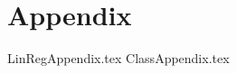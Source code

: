 \documentclass[
	letterpaper,
	a4paper,
	cleardoublepage=empty,
	headings=twolinechapter,
	numbers=autoenddot,
]{article}
\newcounter{appendix}
\begin{document}
	\pagebreak
	
	

	


	\pagebreak
	
	
	\appendix
	
	\section*{Appendix}
	\label{appendix:app}
	
	{LinRegAppendix.tex}
	{ClassAppendix.tex}
	
\end{document}
